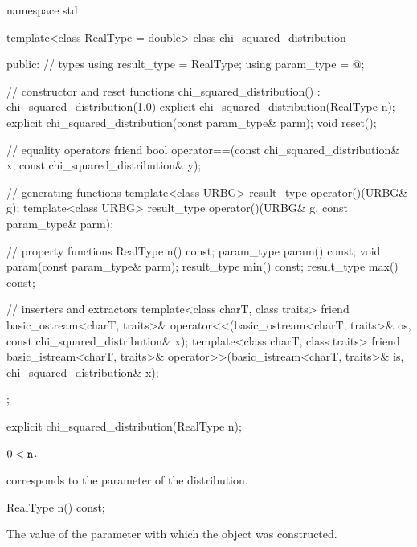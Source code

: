%
%
\begin{codeblock}
namespace std {
  template<class RealType = double>
  class chi_squared_distribution {
  public:
    // types
    using result_type = RealType;
    using param_type  = @\unspec@;

    // constructor and reset functions
    chi_squared_distribution() : chi_squared_distribution(1.0) {}
    explicit chi_squared_distribution(RealType n);
    explicit chi_squared_distribution(const param_type& parm);
    void reset();

    // equality operators
    friend bool operator==(const chi_squared_distribution& x, const chi_squared_distribution& y);

    // generating functions
    template<class URBG>
      result_type operator()(URBG& g);
    template<class URBG>
      result_type operator()(URBG& g, const param_type& parm);

    // property functions
    RealType n() const;
    param_type param() const;
    void param(const param_type& parm);
    result_type min() const;
    result_type max() const;

    // inserters and extractors
    template<class charT, class traits>
      friend basic_ostream<charT, traits>&
        operator<<(basic_ostream<charT, traits>& os, const chi_squared_distribution& x);
    template<class charT, class traits>
      friend basic_istream<charT, traits>&
        operator>>(basic_istream<charT, traits>& is, chi_squared_distribution& x);
  };
}
\end{codeblock}


%
\begin{itemdecl}
explicit chi_squared_distribution(RealType n);
\end{itemdecl}

\begin{itemdescr}
\pnum
\expects
$0 < \tcode{n}$.

\pnum
\remarks
{} corresponds to the parameter of the distribution.
\end{itemdescr}

%
\begin{itemdecl}
RealType n() const;
\end{itemdecl}

\begin{itemdescr}
\pnum
\returns
The value of the  parameter
 with which the object was constructed.
\end{itemdescr}

